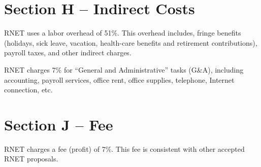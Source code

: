 \section{Section H -- Indirect Costs}
RNET uses a labor overhead of 51\%. This overhead includes, fringe
benefits (holidays, sick leave, vacation, health-care benefits and
retirement contributions), payroll taxes, and other indirect charges.

RNET charges 7\% for ``General and Administrative'' tasks (G\&A),
including accounting, payroll services, office rent, office supplies,
telephone, Internet connection, etc.

\section{Section J -- Fee}
RNET charges a fee (profit) of 7\%.  This fee is consistent with other
accepted RNET proposals.



